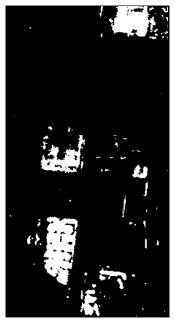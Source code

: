 \begin{figure}[t]
\begin{subfigure}[b]{0.18\columnwidth}
		\includegraphics[width=\textwidth]{Figures/CD/ADD/e}
		\caption{}
\end{subfigure}


\end{figure}
